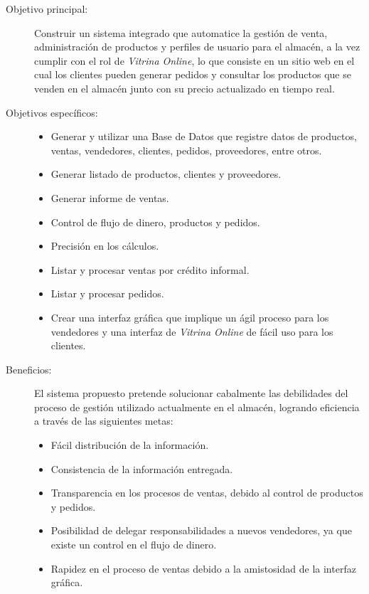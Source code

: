 \documentclass[letterpaper,12pt]{article}
\begin{document}
\begin{description}
\item[Objetivo principal:] \mbox{} 

Construir un sistema integrado que automatice la gestión de venta, administración de productos y perfiles de usuario 
para el almacén, a la vez cumplir con el rol de \emph{Vitrina Online}, lo que consiste en un sitio web en el cual los clientes 
pueden generar pedidos y consultar los productos que se venden en el almacén junto con su precio actualizado en tiempo real.

\item[Objetivos específicos:] \mbox{}

\begin{itemize}
\item Generar y utilizar una Base de Datos que registre datos de productos, ventas, vendedores, clientes, pedidos, proveedores, entre otros.
\item Generar listado de productos, clientes y proveedores.
\item Generar informe de ventas.
\item Control de flujo de dinero, productos y pedidos.
\item Precisión en los cálculos.
\item Listar y procesar ventas por crédito informal.
\item Listar y procesar pedidos.
\item Crear una interfaz gráfica que implique un ágil proceso para los vendedores y una interfaz de
\emph{Vitrina Online} de  fácil uso para los clientes. 
\end{itemize}

\newpage

\item[Beneficios:] \mbox{} 

El sistema propuesto pretende solucionar cabalmente las debilidades del proceso de gestión
utilizado actualmente en el almacén, logrando eficiencia a través de las siguientes metas:

\begin{itemize}
\item Fácil distribución de la información.
\item Consistencia de la información entregada. 
\item Transparencia en los procesos de ventas, debido al control de productos y pedidos.
\item Posibilidad de delegar responsabilidades a nuevos vendedores, ya que existe un control en el flujo de dinero.
\item Rapidez en el proceso de ventas debido a la amistosidad de la interfaz gráfica.	
\end{itemize}

\end{description}
\end{document}
